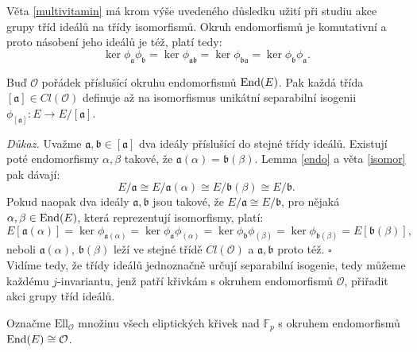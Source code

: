\documentclass[12pt]{report}
\begin{document}
Věta \ref{multivitamin} má krom výše uvedeného důsledku užití při studiu akce grupy tříd ideálů na třídy isomorfismů. Okruh endomorfismů je komutativní a proto násobení jeho ideálů je též, platí tedy:
\begin{equation*}
\ker \phi_{\mathfrak{a}} \phi_{\mathfrak{b}} = \ker \phi_{\mathfrak{ab}} =\ker \phi_{\mathfrak{ba}} = \ker \phi_{\mathfrak{b}} \phi_{\mathfrak{a}}.
\end{equation*}


\begin{veta}
Buď $\mathcal{O}$ pořádek příslušící okruhu endomorfismů $\operatorname{End}(E)$. Pak každá třída $[\mathfrak{a}] \in Cl(\mathcal{O})$ definuje až na isomorfismus unikátní separabilní isogenii $\phi_{[\mathfrak{a}]} : E \longrightarrow E/[\mathfrak{a}]$.
\end{veta}
\noindent \textit{Důkaz.} Uvažme $\mathfrak{a},\mathfrak{b} \in [\mathfrak{a}]$ dva ideály příslušící do stejné třídy ideálů. Existují poté endomorfismy $\alpha,\beta$ takové, že $\mathfrak{a}(\alpha) =  \mathfrak{b}(\beta)$. Lemma \ref{endo} a věta \ref{isomor} pak dávají:
\begin{equation*}
E/\mathfrak{a} \cong E/\mathfrak{a}(\alpha)\cong E/\mathfrak{b}(\beta) \cong E/\mathfrak{b}.
\end{equation*}
Pokud naopak dva ideály $\mathfrak{a},\mathfrak{b}$ jsou takové, že $E/\mathfrak{a} \cong E/\mathfrak{b}$, pro nějaká $\alpha,\beta \in \operatorname{End}(E)$, která reprezentují isomorfismy, platí:
\begin{equation*}
E[\mathfrak{a}(\alpha)] = \ker \phi_{\mathfrak{a}(\alpha)} =  \ker \phi_{\mathfrak{a}} \phi_{(\alpha)} = \ker  \phi_{\mathfrak{b}} \phi_{(\beta)} = \ker \phi_{\mathfrak{b} (\beta)} = E[\mathfrak{b}(\beta)],
\end{equation*}
neboli $\mathfrak{a}(\alpha)$, $\mathfrak{b}(\beta)$ leží ve stejné třídě $Cl(\mathcal{O})$ a $\mathfrak{a}, \mathfrak{b}$ proto též.
\hfill $\square$\\

Vidíme tedy, že třídy ideálů jednoznačně určují separabilní isogenie, tedy můžeme každému $j$-invariantu, jenž patří křivkám s okruhem endomorfismů $\mathcal{O}$, přiřadit akci grupy tříd ideálů.

\begin{definice}
Označme $\mathrm{Ell}_{\mathcal{O}}$ množinu všech eliptických křivek nad $\mathbb{F}_p$ s okruhem endomorfismů $\operatorname{End}(E) \cong \mathcal{O}$.  
\end{definice}
\end{document}
